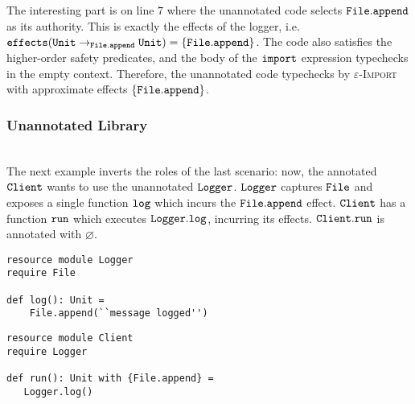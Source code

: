 The interesting part  is on line $7$ where the unannotated code selects $\mathtt{File.append}$ as its authority. This is exactly the effects of the logger, i.e. $\mathtt{effects}(\mathtt{Unit} \rightarrow_{\mathtt{File.append}} \mathtt{Unit}) = \{ \mathtt{File.append} \}$. The code also satisfies the higher-order safety predicates, and the body of the $\mathtt{import}$ expression typechecks in the empty context. Therefore, the unannotated code typechecks by \textsc{$\varepsilon$-Import} with approximate effects $\mathtt{\{ \mathtt{File.append} \}}$.\\









































\subsubsection{Unannotated Library}~\\

The next example inverts the roles of the last scenario: now, the annotated $\mathtt{Client}$ wants to use the unannotated $\mathtt{Logger}$. $\mathtt{Logger}$ captures $\mathtt{File}$ and exposes a single function $\mathtt{log}$ which incurs the $\mathtt{File.append}$ effect. $\mathtt{Client}$ has a function $\mathtt{run}$ which executes $\mathtt{Logger.log}$, incurring its effects. $\mathtt{Client.run}$ is annotated with $\varnothing$.

\begin{lstlisting}
resource module Logger
require File

def log(): Unit =
    File.append(``message logged'')
\end{lstlisting}

\begin{lstlisting}
resource module Client
require Logger

def run(): Unit with {File.append} =
   Logger.log()
\end{lstlisting}

